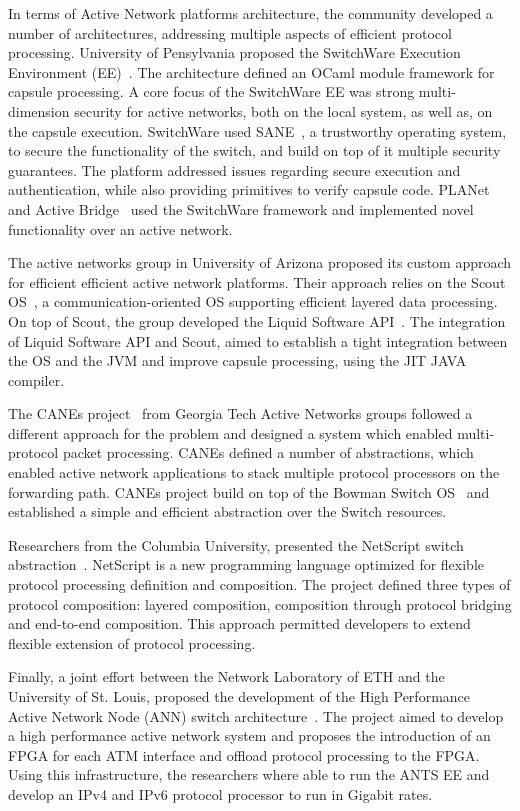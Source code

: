 In terms of Active Network platforms architecture, the community developed a
number of architectures, addressing multiple aspects of efficient protocol
processing. University of Pensylvania proposed the SwitchWare Execution
Environment (EE)~\cite{Alexander1998}.  The architecture defined an OCaml module
framework for capsule processing. A core focus of the SwitchWare EE was strong
multi-dimension security for active networks, both on the local system, as well as, on
the capsule execution.  SwitchWare used SANE~\cite{Alexander1998b}, a
trustworthy operating system, to secure the functionality of the switch, and
build on top of it multiple security guarantees. The platform addressed issues
regarding secure execution and authentication, while also providing primitives
to verify capsule code.
PLANet~\cite{Hicks1999} and Active Bridge~\cite{Alexander1997} used the
SwitchWare framework and implemented novel functionality over an active network. 

The active networks group in University of Arizona proposed its custom approach
for efficient efficient active network platforms. Their approach relies on the Scout
OS~\cite{Montz1995}, a communication-oriented OS supporting efficient
layered data processing. On top of Scout, the group developed the Liquid Software
API~\cite{Hartman1999}. The integration of Liquid Software API and Scout, aimed to
establish a tight integration between the OS and the JVM and improve capsule
processing, using the JIT JAVA compiler. 

The CANEs project~\cite{Chae2002} from Georgia Tech Active Networks groups
followed a different approach for the problem and designed a system which
enabled multi-protocol packet processing. CANEs defined a number of
abstractions, which enabled active network applications to stack multiple
protocol processors on the forwarding path. CANEs project build on top of the
Bowman Switch OS~\cite{merugu1999} and established a simple and efficient
abstraction over the Switch resources. 

Researchers from the Columbia University, presented the NetScript switch
abstraction~\cite{daSilva2001}. NetScript is a new programming language
optimized for flexible protocol processing definition and composition. The
project defined three types of protocol composition: layered composition,
composition through protocol bridging and end-to-end composition. This approach 
permitted developers to extend flexible extension of protocol processing. 

Finally, a joint effort between the Network Laboratory of ETH and the University
of St. Louis, proposed the development of the High Performance Active Network
Node (ANN) switch architecture~\cite{Decasper1999}. The project aimed to develop a high performance
active network system and proposes the introduction of an FPGA for each ATM
interface and offload protocol processing to the FPGA. Using this
infrastructure, the researchers where able to run the ANTS EE and develop an
IPv4 and IPv6 protocol processor to run in Gigabit rates. 

